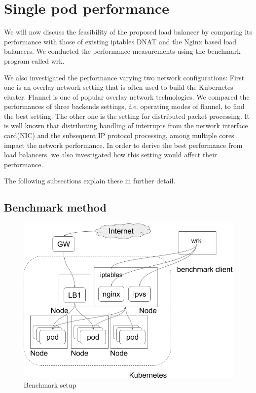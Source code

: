 
\section{Single pod performance}

We will now discuss the feasibility of the proposed load balancer by comparing 
its performance with those of existing iptables DNAT and the Nginx based load balancers. 
We conducted the performance measurements using the benchmark program called wrk\cite{Glozer2016}.

We also investigated the performance varying two network configurations: 
First one is an overlay network setting\cite{Sill2016,Marmol2015} that is often used to build the Kubernetes cluster. 
Flannel\cite{CoreOSFlannel} is one of popular overlay network technologies. 
We compared the performances of three backends settings\cite{CoreOSFlannelBackend}, 
{\it i.e.} operating modes of flannel, to find the best setting.
The other one is the setting for distributed packet processing.
It is well known that distributing handling of interrupts from the network interface card(NIC) 
and the subsequent IP protocol processing, among multiple cores impact the network performance.
In order to derive the best performance from load balancers, 
we also investigated how this setting would affect their performance.

The following subsections explain these in further detail. 

\subsection{Benchmark method}

\begin{figure}
  \centering
  \includegraphics[width=0.8\columnwidth]{Figs/benchmark-schem}
  \caption{Benchmark setup}
  \label{fig:benchmark-schem}
\end{figure}

